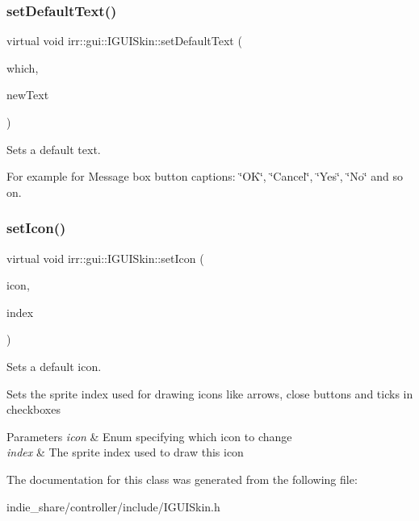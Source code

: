 \subsubsection{\texorpdfstring{set\+Default\+Text()}{setDefaultText()}}
{\footnotesize\ttfamily virtual void irr\+::gui\+::\+I\+G\+U\+I\+Skin\+::set\+Default\+Text (\begin{DoxyParamCaption}\item[{\hyperlink{namespaceirr_1_1gui_a18bc64c635f8b0db66498d779569e296}{E\+G\+U\+I\+\_\+\+D\+E\+F\+A\+U\+L\+T\+\_\+\+T\+E\+XT}}]{which,  }\item[{const wchar\+\_\+t $\ast$}]{new\+Text }\end{DoxyParamCaption})\hspace{0.3cm}{\ttfamily [pure virtual]}}



Sets a default text. 

For example for Message box button captions\+: \char`\"{}\+O\+K\char`\"{}, \char`\"{}\+Cancel\char`\"{}, \char`\"{}\+Yes\char`\"{}, \char`\"{}\+No\char`\"{} and so on. \mbox{\label{classirr_1_1gui_1_1IGUISkin_a7994f1001681b5eabf398b5c4c24c304}} 
\subsubsection{\texorpdfstring{set\+Icon()}{setIcon()}}
{\footnotesize\ttfamily virtual void irr\+::gui\+::\+I\+G\+U\+I\+Skin\+::set\+Icon (\begin{DoxyParamCaption}\item[{\hyperlink{namespaceirr_1_1gui_a8e54aa253459daf0b62670bda4556d9f}{E\+G\+U\+I\+\_\+\+D\+E\+F\+A\+U\+L\+T\+\_\+\+I\+C\+ON}}]{icon,  }\item[{\hyperlink{namespaceirr_a0416a53257075833e7002efd0a18e804}{u32}}]{index }\end{DoxyParamCaption})\hspace{0.3cm}{\ttfamily [pure virtual]}}



Sets a default icon. 

Sets the sprite index used for drawing icons like arrows, close buttons and ticks in checkboxes 
\begin{DoxyParams}{Parameters}
{\em icon} & Enum specifying which icon to change \\
\hline
{\em index} & The sprite index used to draw this icon \\
\hline
\end{DoxyParams}


The documentation for this class was generated from the following file\+:\begin{DoxyCompactItemize}
\item 
indie\+\_\+share/controller/include/I\+G\+U\+I\+Skin.\+h\end{DoxyCompactItemize}
